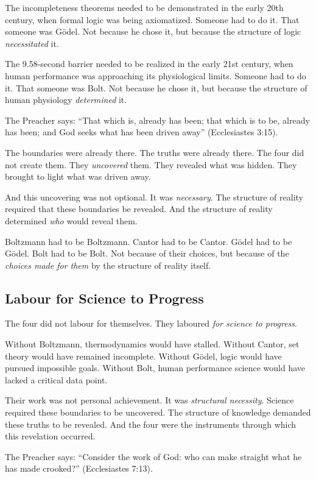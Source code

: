 \documentclass[11pt,a4paper]{article}
\begin{document}
The incompleteness theorems needed to be demonstrated in the early 20th 
century, when formal logic was being axiomatized. Someone had to do it. That 
someone was Gödel. Not because he chose it, but because the structure of logic 
\emph{necessitated} it.

The 9.58-second barrier needed to be realized in the early 21st century, when 
human performance was approaching its physiological limits. Someone had to do 
it. That someone was Bolt. Not because he chose it, but because the structure 
of human physiology \emph{determined} it.

The Preacher says: ``That which is, already has been; that which is to be, 
already has been; and God seeks what has been driven away'' (Ecclesiastes 
3:15).

The boundaries were already there. The truths were already there. The four did 
not create them. They \emph{uncovered} them. They revealed what was hidden. 
They brought to light what was driven away.

And this uncovering was not optional. It was \emph{necessary}. The structure 
of reality required that these boundaries be revealed. And the structure of 
reality determined \emph{who} would reveal them.

Boltzmann had to be Boltzmann. Cantor had to be Cantor. Gödel had to be 
Gödel. Bolt had to be Bolt. Not because of their choices, but because of the 
\emph{choices made for them} by the structure of reality itself.

\subsection{Labour for Science to Progress}

The four did not labour for themselves. They laboured \emph{for science to 
progress}.

Without Boltzmann, thermodynamics would have stalled. Without Cantor, set 
theory would have remained incomplete. Without Gödel, logic would have pursued 
impossible goals. Without Bolt, human performance science would have lacked a 
critical data point.

Their work was not personal achievement. It was \emph{structural necessity}. 
Science required these boundaries to be uncovered. The structure of knowledge 
demanded these truths to be revealed. And the four were the instruments through 
which this revelation occurred.

The Preacher says: ``Consider the work of God: who can make straight what he 
has made crooked?'' (Ecclesiastes 7:13).
\end{document}
